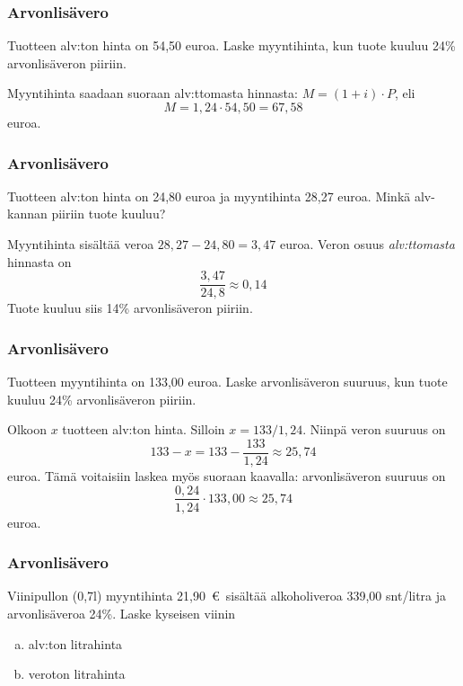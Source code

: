 \documentclass[]{beamer}\usepackage[]{graphicx}\usepackage[]{color}
\begin{document}
\begin{frame}
\frametitle{Arvonlisävero}
	\begin{esim}
		Tuotteen alv:ton hinta on 54,50 euroa. Laske myyntihinta, kun tuote kuuluu 24\% arvonlisäveron piiriin.
	\end{esim}
	\pause
	\begin{ratkaisu}
		Myyntihinta saadaan suoraan alv:ttomasta hinnasta: \(M = (1+i)\cdot P\), eli \pause 
	\[
		M = 1,24\cdot 54,50 = 67,58
	\] euroa.
	\end{ratkaisu}
\end{frame}


\begin{frame}
\frametitle{Arvonlisävero}
	\begin{esim}
		Tuotteen alv:ton hinta on 24,80 euroa ja myyntihinta 28,27 euroa. Minkä alv-kannan piiriin tuote kuuluu?
	\end{esim}
	\pause
	\begin{ratkaisu}
		Myyntihinta sisältää veroa  \(28,27-24,80 = 3,47\) euroa.\pause
		Veron osuus \emph{alv:ttomasta} hinnasta on 
		\[
			\frac{3,47}{24,8} \approx 0,14
		\]
		\pause
		Tuote kuuluu siis 14\% arvonlisäveron piiriin.
	\end{ratkaisu}
\end{frame}

\begin{frame}
\frametitle{Arvonlisävero}
	\begin{esim}
		Tuotteen myyntihinta on 133,00 euroa. Laske arvonlisäveron suuruus, kun tuote kuuluu 24\% arvonlisäveron piiriin.
	\end{esim}
	\pause
	\begin{ratkaisu}
		Olkoon \(x\) tuotteen alv:ton hinta. \pause Silloin \(x= 133/1,24\). \pause Niinpä veron suuruus on \pause
		\[
			133- x = 133 - \frac{133}{1,24}\approx 25,74
		\]
		euroa. \pause Tämä voitaisiin laskea myös suoraan kaavalla: arvonlisäveron suuruus on \pause
			\[
				\frac{0,24}{1,24}\cdot133,00\approx 25,74
			\]
		euroa.
	\end{ratkaisu}
\end{frame}

\begin{frame}
\frametitle{Arvonlisävero}
	\begin{esim}
		Viinipullon (0,7l) myyntihinta 21,90~\euro\ sisältää alkoholiveroa 339,00 snt/litra ja arvonlisäveroa 24\%. Laske kyseisen viinin
		\begin{enumerate}[(a)]
			\item alv:ton litrahinta
			\item veroton litrahinta
		\end{enumerate}
	\end{esim}
\end{frame}
\end{document}
